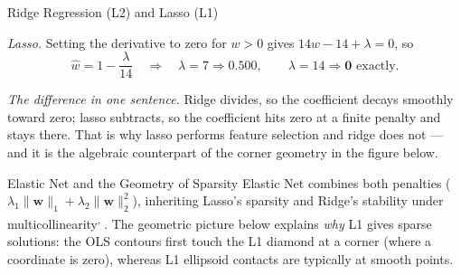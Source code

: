 \begin{v3topic}{Ridge Regression (L2) and Lasso (L1)}
\begin{workedexample}
\emph{Lasso.} Setting the derivative to zero for $w>0$ gives
$14w - 14 + \lambda = 0$, so
\[
  \hat w = 1 - \frac{\lambda}{14}
  \quad\Rightarrow\quad
  \lambda = 7 \Rightarrow 0.500,\qquad
  \lambda = 14 \Rightarrow \mathbf{0} \text{ exactly.}
\]

\emph{The difference in one sentence.} Ridge divides, so the coefficient decays
smoothly toward zero; lasso subtracts, so the coefficient hits zero at a finite
penalty and stays there. That is why lasso performs feature selection and ridge
does not --- and it is the algebraic counterpart of the corner geometry in the
figure below.
\end{workedexample}

\end{v3topic}
\begin{v3topic}{Elastic Net and the Geometry of Sparsity}
    Elastic Net combines both penalties ($\lambda_1\|\mathbf{w}\|_1 + \lambda_2\|\mathbf{w}\|_2^2$), inheriting Lasso's sparsity and Ridge's stability under multicollinearity\textsuperscript{\cite{zouRegularizationVariableSelection2005}, \cite[][pp.~91--97]{iiiCourseMachineLearning}}. The geometric picture below explains \emph{why} L1 gives sparse solutions: the OLS contours first touch the L1 diamond at a corner (where a coordinate is zero), whereas L1 ellipsoid contacts are typically at smooth points.
\visualseparator
\end{v3topic}
